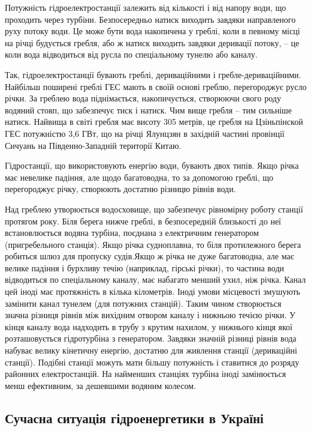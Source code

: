 \documentclass[12pt]{article}
\numberwithin{equation}{section}
\numberwithin{figure}{section}
\begin{document}
Потужність гідроелектростанції залежить від кількості і від напору води, що проходить через турбіни. Безпосередньо натиск виходить завдяки направленого руху потоку води. Це може бути вода накопичена у греблі, коли в певному місці на річці будується гребля, або ж натиск виходить завдяки деривації потоку, – це коли вода відводиться від русла по спеціальному тунелю або каналу.

Так, гідроелектростанції бувають греблі, дериваційними і гребле-дериваційними. Найбільш поширені греблі ГЕС мають в своїй основі греблю, перегороджує русло річки. За греблею вода піднімається, накопичується, створюючи свого роду водяний стовп, що забезпечує тиск і натиск. Чим вище гребля – тим сильніше натиск. Найвища в світі гребля має висоту 305 метрів, це гребля на Цзіньпінской ГЕС потужністю 3,6 ГВт, що на річці Ялунцзян в західній частині провінції Сичуань на Південно-Западній території Китаю.

Гідростанції, що використовують енергію води, бувають двох типів. Якщо річка має невелике падіння, але щодо багатоводна, то за допомогою греблі, що перегороджує річку, створюють достатню різницю рівнів води.

Над греблею утворюється водосховище, що забезпечує рівномірну роботу станції протягом року. Біля берега нижче греблі, в безпосередній близькості до неї встановлюється водяна турбіна, поєднана з електричним генератором (пригребельного станція). Якщо річка судноплавна, то біля протилежного берега робиться шлюз для пропуску судів.Якщо ж річка не дуже багатоводна, але має велике падіння і бурхливу течію (наприклад, гірські річки), то частина води відводиться по спеціальному каналу, має набагато менший ухил, ніж річка. Канал цей іноді має протяжність в кілька кілометрів. Іноді умови місцевості змушують замінити канал тунелем (для потужних станцій). Таким чином створюється значна різниця рівнів між вихідним отвором каналу і нижньою течією річки. У кінця каналу вода надходить в трубу з крутим нахилом, у нижнього кінця якої розташовується гідротурбіна з генератором. Завдяки значній різниці рівнів вода набуває велику кінетичну енергію, достатню для живлення станції (дериваційні станції). Подібні станції можуть мати більшу потужність і ставитися до розряду районних електростанцій. На найменших станціях турбіна іноді замінюється менш ефективним, за дешевшими водяним колесом.


\subsection{Сучасна ситуація гідроенергетики в Україні}
\end{document}
